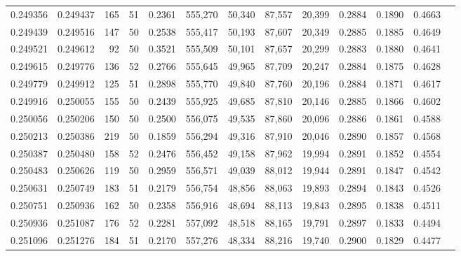 \begin{tabular}{rrrrrrrrrrrrr}
0.249356 & 0.249437 &   165 &  51 &                                     0.2361 & 555,270 &  50,340 &  87,557 &  20,399 & 0.2884 & 0.1890 & 0.4663 \\
0.249439 & 0.249516 &   147 &  50 &                                     0.2538 & 555,417 &  50,193 &  87,607 &  20,349 & 0.2885 & 0.1885 & 0.4649 \\
0.249521 & 0.249612 &    92 &  50 &                                     0.3521 & 555,509 &  50,101 &  87,657 &  20,299 & 0.2883 & 0.1880 & 0.4641 \\
0.249615 & 0.249776 &   136 &  52 &                                     0.2766 & 555,645 &  49,965 &  87,709 &  20,247 & 0.2884 & 0.1875 & 0.4628 \\
0.249779 & 0.249912 &   125 &  51 &                                     0.2898 & 555,770 &  49,840 &  87,760 &  20,196 & 0.2884 & 0.1871 & 0.4617 \\
0.249916 & 0.250055 &   155 &  50 &                                     0.2439 & 555,925 &  49,685 &  87,810 &  20,146 & 0.2885 & 0.1866 & 0.4602 \\
0.250056 & 0.250206 &   150 &  50 &                                     0.2500 & 556,075 &  49,535 &  87,860 &  20,096 & 0.2886 & 0.1861 & 0.4588 \\
0.250213 & 0.250386 &   219 &  50 &                                     0.1859 & 556,294 &  49,316 &  87,910 &  20,046 & 0.2890 & 0.1857 & 0.4568 \\
0.250387 & 0.250480 &   158 &  52 &                                     0.2476 & 556,452 &  49,158 &  87,962 &  19,994 & 0.2891 & 0.1852 & 0.4554 \\
0.250483 & 0.250626 &   119 &  50 &                                     0.2959 & 556,571 &  49,039 &  88,012 &  19,944 & 0.2891 & 0.1847 & 0.4542 \\
0.250631 & 0.250749 &   183 &  51 &                                     0.2179 & 556,754 &  48,856 &  88,063 &  19,893 & 0.2894 & 0.1843 & 0.4526 \\
0.250751 & 0.250936 &   162 &  50 &                                     0.2358 & 556,916 &  48,694 &  88,113 &  19,843 & 0.2895 & 0.1838 & 0.4511 \\
0.250936 & 0.251087 &   176 &  52 &                                     0.2281 & 557,092 &  48,518 &  88,165 &  19,791 & 0.2897 & 0.1833 & 0.4494 \\
0.251096 & 0.251276 &   184 &  51 &                                     0.2170 & 557,276 &  48,334 &  88,216 &  19,740 & 0.2900 & 0.1829 & 0.4477 \\

\end{tabular}
